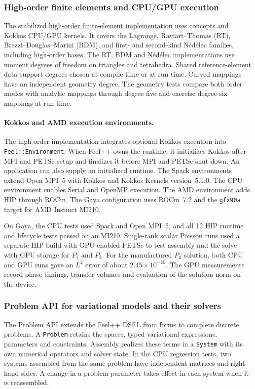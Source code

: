 \subsubsection{High-order finite elements and CPU/GPU execution}
\label{sec:Feelpp:implementation-2026:orders}
The stabilized
\href{https://github.com/feelpp/feelpp/issues/2383}{high-order finite-element implementation}
uses  concepts and Kokkos CPU/GPU kernels. It covers the Lagrange,
Raviart--Thomas (RT), Brezzi--Douglas--Marini (BDM), and first- and second-kind
N\'ed\'elec families, including high-order bases. The RT, BDM and N\'ed\'elec
implementations use moment degrees of freedom on triangles and tetrahedra.
Shared reference-element data support degrees chosen at compile time or at
run time. Curved mappings have an independent geometry degree. The geometry
tests compare both order modes with analytic mappings through degree five
and exercise degree-six mappings at run time.

\paragraph{Kokkos and AMD execution environments.}
The high-order implementation integrates optional Kokkos execution into
\texttt{Feel::Environment}. When Feel++ owns the runtime, it initializes
Kokkos after MPI and PETSc setup and finalizes it before MPI and PETSc
shut down. An application can also supply an initialized runtime.
The Spack environments extend Open MPI~5 with Kokkos and Kokkos Kernels
version~5.1.0. The CPU environment enables Serial and OpenMP execution.
The AMD environment adds HIP through ROCm. The Gaya configuration uses
ROCm~7.2 and the \texttt{gfx90a} target for AMD Instinct MI210.

On Gaya, the CPU tests used Spack and Open MPI~5, and all 12 HIP runtime
and lifecycle tests passed on an MI210. Single-rank scalar Poisson runs
used a separate HIP build with GPU-enabled PETSc to test assembly and
the solve with GPU storage for $P_1$
and $P_2$. For the manufactured $P_2$ solution, both CPU and GPU runs gave
an $L^2$ error of about $2.45\times 10^{-10}$. The GPU measurements record
phase timings, transfer volumes and evaluation of the solution norm on the
device.

\subsubsection{Problem API for variational models and their solvers}
\label{sec:Feelpp:implementation-2026:problem-api}
The Problem API extends the Feel++ DSEL from forms to complete discrete
problems. A \texttt{Problem} retains the spaces, typed variational
expressions, parameters and constraints. Assembly realizes these terms in a
\texttt{System} with its own numerical operators and solver state. In the
CPU regression tests, two systems assembled from the same problem have
independent matrices and right-hand sides. A change in a problem parameter
takes effect in each system when it is reassembled.

